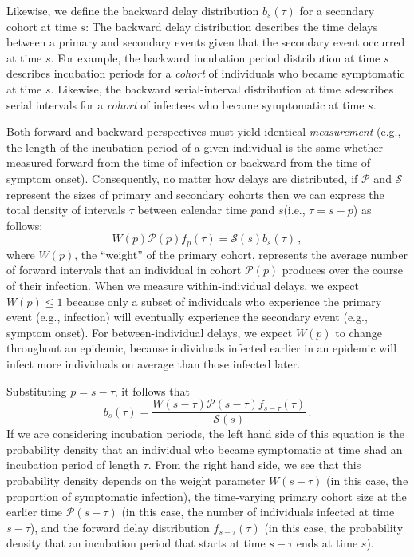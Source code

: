 \documentclass[12pt]{article}
\newcommand{\psymp}{\ensuremath{p}} %
\newcommand{\ssymp}{\ensuremath{s}} %
\newcommand{\psize}{{\mathcal P}} %
\newcommand{\ssize}{{\mathcal S}} %
\begin{document}
Likewise, we define the backward delay distribution $b_\ssymp(\tau)$ for a secondary cohort at time \ssymp:
The backward delay distribution describes the time delays between a primary and secondary events given that the secondary event occurred at time \ssymp.
For example, the backward incubation period distribution at time \ssymp describes incubation periods for a \emph{cohort} of individuals who became symptomatic at time \ssymp.
Likewise, the backward serial-interval distribution at time \ssymp describes serial intervals for a \emph{cohort} of infectees who became symptomatic at time \ssymp.

Both forward and backward perspectives
must yield identical \emph{measurement} (e.g., the length of the incubation
period of a given individual is the same whether measured forward from
the time of infection or backward from the time of symptom onset).
Consequently, no matter how delays are distributed, if
$\mathcal P$ and $\mathcal S$ represent the sizes of primary and
secondary cohorts then we can express the total density of intervals $\tau$ between calendar time \psymp and \ssymp (i.e., $\tau=\ssymp-\psymp$) as follows:
\begin{equation}
W(\psymp) \psize(\psymp) f_\psymp(\tau) = \ssize(\ssymp) b_\ssymp(\tau) \,,
\label{eq:match}
\end{equation}
where $W(\psymp)$, the ``weight'' of the primary cohort, represents the average number of forward intervals that an individual in cohort $\psize(\psymp)$ produces over the course of their infection.
When we measure within-individual delays, we expect $W(\psymp) \leq 1$ because only a subset of individuals who experience the primary event (e.g., infection) will eventually experience the secondary event (e.g., symptom onset).
For between-individual delays, we expect $W(\psymp)$ to change throughout an epidemic, because individuals infected earlier in an epidemic will infect more individuals on average than those infected later.

Substituting $\psymp=\ssymp-\tau$, it follows that
\begin{equation}
b_\ssymp(\tau)= \frac{W(\ssymp-\tau) \psize(\ssymp-\tau) f_{\ssymp-\tau} (\tau)}{\ssize(\ssymp)}\,.
\label{eq:backward}
\end{equation}
If we are considering incubation periods, the left hand side of
this equation is the probability density that an individual
who became symptomatic at time \ssymp had an incubation period of
length $\tau$.
From the right hand side, we see that this probability density depends on the weight parameter $W(\ssymp-\tau)$ (in this case, the proportion of symptomatic infection),
the time-varying primary cohort size at the earlier time $\psize(\ssymp-\tau)$ (in this case, the number of individuals infected at time $\ssymp-\tau$),
and the forward delay distribution $f_{\ssymp-\tau}(\tau)$ (in this case, the probability density that an incubation period that starts at time $\ssymp-\tau$ ends at time \ssymp).
\end{document}
